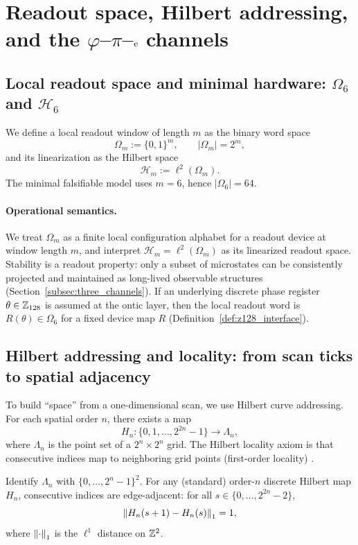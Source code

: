 
\section{Readout space, Hilbert addressing, and the \texorpdfstring{$\varphi$--$\pi$--$\mathrm{e}$}{phi--pi--e} channels}
\label{sec:readout_addressing_three_channels}

\subsection{Local readout space and minimal hardware: \texorpdfstring{$\Omega_6$}{Omega6} and \texorpdfstring{$\mathcal{H}_6$}{H6}}
\label{subsec:local_readout}

We define a local readout window of length $m$ as the binary word space
\[
\Omega_m:=\{0,1\}^m,\qquad |\Omega_m|=2^m,
\]
and its linearization as the Hilbert space
\[
\mathcal{H}_m:=\ell^2(\Omega_m).
\]
The minimal falsifiable model uses $m=6$, hence $|\Omega_6|=64$.

\paragraph{Operational semantics.}
We treat $\Omega_m$ as a finite local configuration alphabet for a readout device at window length $m$, and interpret $\mathcal{H}_m=\ell^2(\Omega_m)$ as its linearized readout space.
Stability is a readout property: only a subset of microstates can be consistently projected and maintained as long-lived observable structures (Section~\ref{subsec:three_channels}).
If an underlying discrete phase register $\theta\in\mathbb{Z}_{128}$ is assumed at the ontic layer, then the local readout word is $R(\theta)\in\Omega_6$ for a fixed device map $R$ (Definition~\ref{def:z128_interface}).

\subsection{Hilbert addressing and locality: from scan ticks to spatial adjacency}
\label{subsec:hilbert_addressing}

To build ``space'' from a one-dimensional scan, we use Hilbert curve addressing.
For each spatial order $n$, there exists a map
\[
H_n:\{0,1,\dots,2^{2n}-1\}\to \Lambda_n,
\]
where $\Lambda_n$ is the point set of a $2^n\times 2^n$ grid.
The Hilbert locality axiom is that consecutive indices map to neighboring grid points (first-order locality) \cite{Hilbert1891,Sagan1994}.

\begin{lemma}
\label{lem:hilbert_locality}
Identify $\Lambda_n$ with $\{0,\dots,2^n-1\}^2$.
For any (standard) order-$n$ discrete Hilbert map $H_n$, consecutive indices are edge-adjacent:
for all $s\in\{0,\dots,2^{2n}-2\}$,
\[
\left\lVert H_n(s+1)-H_n(s)\right\rVert_1=1,
\]
where $\left\lVert \cdot\right\rVert_1$ is the $\ell^1$ distance on $\mathbb{Z}^2$.
\end{lemma}

